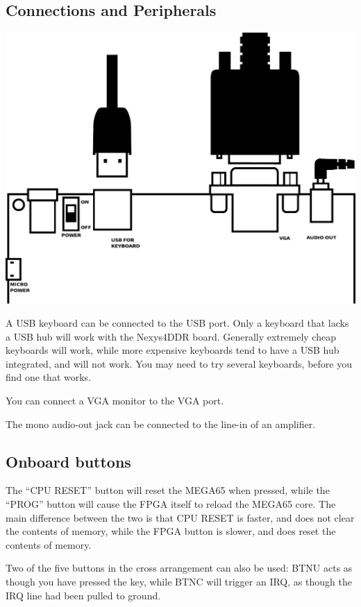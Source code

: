 \subsection{Connections and Peripherals}

\includegraphics[width=\linewidth]{images/illustrations/nexys-connectors.pdf}

A USB keyboard can be connected to the USB port. Only a keyboard that lacks a USB hub will work with the Nexys4DDR board.  Generally extremely cheap keyboards will work, while more expensive keyboards tend to have a USB hub integrated, and will not work.  You may need to try several keyboards, before you find one that works.

You can connect a VGA monitor to the VGA port.

The mono audio-out jack can be connected to the line-in of an amplifier.

\subsection{Onboard buttons}

The ``CPU RESET'' button will reset the MEGA65 when pressed, while the ``PROG'' button will cause the FPGA itself to reload the MEGA65
core.  The main difference between the two is that CPU RESET is faster, and does not clear the contents of memory, while the FPGA button
is slower, and does reset the contents of memory.

Two of the five buttons in the cross arrangement can also be used:  BTNU acts as though you have pressed the  key, while BTNC will trigger an IRQ, as though the IRQ line had been pulled to ground.

